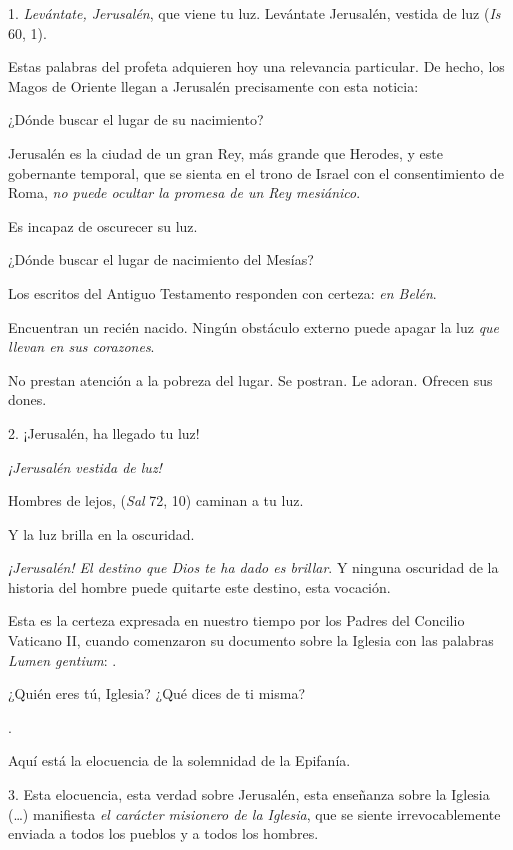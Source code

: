 \begin{body}
	1. \emph{Levántate, Jerusalén}, que viene tu luz. Levántate Jerusalén, vestida de luz (\emph{Is} 60, 1).

	Estas palabras del profeta adquieren hoy una relevancia particular. De hecho, los Magos de Oriente llegan a Jerusalén precisamente con esta noticia: 

	¿Dónde buscar el lugar de su nacimiento?

	Jerusalén es la ciudad de un gran Rey, más grande que Herodes, y este gobernante temporal, que se sienta en el trono de Israel con el consentimiento de Roma, \emph{no puede ocultar la promesa de un Rey mesiánico}.

	Es incapaz de oscurecer su luz.

	¿Dónde buscar el lugar de nacimiento del Mesías?

	Los escritos del Antiguo Testamento responden con certeza: \emph{en Belén}.

	Encuentran un recién nacido. Ningún obstáculo externo puede apagar la luz \emph{que llevan en sus corazones}.

	No prestan atención a la pobreza del lugar. Se postran. Le adoran. Ofrecen sus dones.

	2. ¡Jerusalén, ha llegado tu luz!

	\emph{¡Jerusalén vestida de luz!}

	Hombres de lejos,  (\emph{Sal} 72, 10) caminan a tu luz.

	Y la luz brilla en la oscuridad.

	\emph{¡Jerusalén! El destino que Dios te ha dado es brillar}. Y ninguna oscuridad de la historia del hombre puede quitarte este destino, esta vocación.

	Esta es la certeza expresada en nuestro tiempo por los Padres del Concilio Vaticano II, cuando comenzaron su documento sobre la Iglesia con las palabras \emph{Lumen gentium}: .

	¿Quién eres tú, Iglesia? ¿Qué dices de ti misma?

	.

	Aquí está la elocuencia de la solemnidad de la Epifanía.

	3. Esta elocuencia, esta verdad sobre Jerusalén, esta enseñanza sobre la Iglesia (\ldots{}) manifiesta \emph{el carácter misionero de la Iglesia}, que se siente irrevocablemente enviada a todos los pueblos y a todos los hombres.


\end{body}
